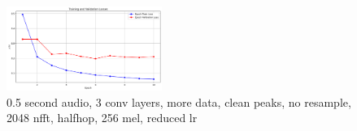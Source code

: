 \documentclass[twocolumn]{article}
\begin{document}
\begin{figure}
\centering
\includegraphics[width=0.45\textwidth]{figures/loss_plot_moredata_halfs_3conv_cleanpeaks_noresample_2048nfft_halfhop_256nmel_drop_lr.png}
\caption{0.5 second audio, 3 conv layers, more data, clean peaks, no resample, 2048 nfft, halfhop, 256 mel, reduced lr}
\label{fig:loss_plot_moredata_halfs_3conv_cleanpeaks_noresample_2048nfft_halfhop_256nmel_drop_lr}
\end{figure}

\printbibliography
\end{document}
